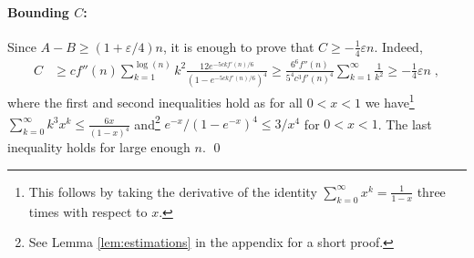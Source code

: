 \documentclass[11pt]{article}
\theoremstyle{plain}
\begin{document}
\paragraph{Bounding $C$:}
Since $A-B\geq (1+\varepsilon/4)n$, it is enough to prove that $C\geq -\frac{1}{4}\varepsilon n$. Indeed,
\begin{align*}
    C&\geq cf''(n) \sum _{k=1}^{\log(n)}k^2\frac{12e^{-5c k f'(n)/6}}{\left(1-e^{-5c k f'(n)/6}\right)^4} \geq\frac{6^6 f''(n)}{5^4c^3f'(n)^4}  \sum_{k=1}^{\infty} \frac{1}{k^2}\geq -\frac{1}{4}\varepsilon n\;,
\end{align*}
where the first and second inequalities hold as for all $0<x< 1$ we have\footnote{This follows by taking the derivative of the identity $\sum_{k=0}^{\infty}x^{k}=\frac{1}{1-x}$ three times with respect to $x$.} $\sum_{k=0}^{\infty}k^3x^{k}\leq \frac{6x}{(1-x)^4}$ and\footnote{See Lemma \ref{lem:estimations} in the appendix for a short proof.} $e^{-x}/(1-e^{-x})^4\leq 3/x^4$ for $0<x<1$. The last inequality holds for large enough $n$. \qed
\end{document}
